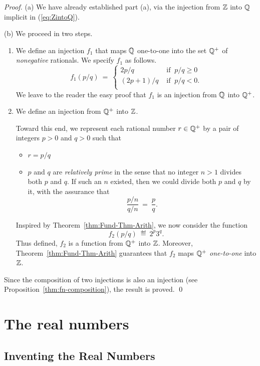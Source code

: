 \begin{proof}
(a) We have already established part (a), via the injection from $\mathbb{Z}$
into $\mathbb{Q}$ implicit in (\ref{eq:ZintoQ}).

\medskip

\noindent (b)
We proceed in two steps.
\begin{enumerate}
\item
We define an injection $f_1$ that maps $\mathbb{Q}$ one-to-one into the set
$\mathbb{Q}^+$ of {\em nonegative} rationals.  We specify $f_1$ as follows.
\[ f_1(p/q) \ = \ \left\{
\begin{array}{cl}
2p/q & \mbox{ if } \ p/q \geq 0 \\
(2p+1)/q & \mbox{ if } \ p/q < 0. \\
\end{array}
\right.
\]
We leave to the reader the easy proof that $f_1$ is an injection from
$\mathbb{Q}$ into $\mathbb{Q}^+$.

\item
We define an injection from $\mathbb{Q}^+$ into $\mathbb{Z}$.

Toward this end, we represent each rational number $r \in \mathbb{Q}^+$ by a
pair of integers $p > 0$ and $q >0$ such that
\begin{itemize}
\item
$r = p/q$

\item
$p$ and $q$ are {\em relatively prime}  in the sense that no integer $n > 1$ divides both $p$ and
  $q$.  If such an $n$ existed, then we could divide both $p$ and $q$
  by it, with the assurance that
\[ \frac{p/n}{q/n} \ = \ \frac{p}{q}. \]
\end{itemize}
Inspired by Theorem~\ref{thm:Fund-Thm-Arith}, we now consider the
function
\[ f_2(p/q) \ \eqdef \ 2^p 3^q. \]
Thus defined, $f_2$ is a function from $\mathbb{Q}^+$ into $\mathbb{Z}$.  Moreover,
Theorem~\ref{thm:Fund-Thm-Arith} guarantees that $f_2$ maps $\mathbb{Q}^+$
{\em one-to-one} into $\mathbb{Z}$.
\end{enumerate}
Since the composition of two injections is also an injection (see
Proposition~\ref{thm:fn-composition}), the result is proved.  \qed
\end{proof}

\section{The real numbers}
\label{sec:reals}

\subsection{Inventing the Real Numbers}


